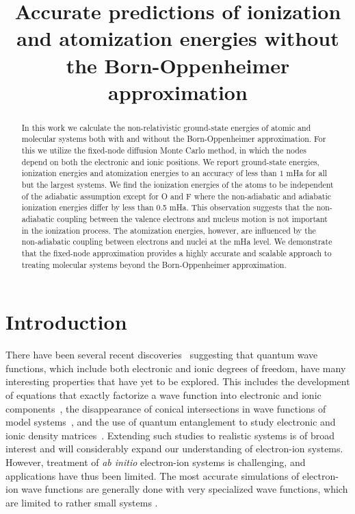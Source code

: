 \documentclass[pra,superscriptaddress,groupedaddress,twocolumn]{revtex4}
\begin{document}
\title{Accurate predictions of ionization and atomization energies without the Born-Oppenheimer approximation}

\begin{abstract}
In this work we calculate the non-relativistic ground-state energies of atomic and molecular systems both with and without the Born-Oppenheimer approximation. For this we utilize the fixed-node diffusion Monte Carlo method, in which the nodes depend on both the electronic and ionic positions. We report ground-state energies, ionization energies and atomization energies to an accuracy of less than $1$ mHa for all but the largest systems. We find the ionization energies of the atoms to be independent of the adiabatic assumption except for O and F where the non-adiabatic and adiabatic ionization energies differ by less than 0.5 mHa. This observation suggests that the non-adiabatic coupling between the valence electrons and nucleus motion is not important in the ionization process. The atomization energies, however, are influenced by the non-adiabatic coupling between electrons and nuclei at the mHa level. We demonstrate that the fixed-node approximation provides a highly accurate and scalable approach to treating molecular systems beyond the Born-Oppenheimer approximation.
\end{abstract}
\maketitle

\section{Introduction}
There have been several recent discoveries~\cite{cederbaum1,gross2014,boent} suggesting that quantum wave functions, which include both electronic and ionic degrees of freedom, have many interesting properties that have yet to be explored.  This includes the development of equations that exactly factorize a wave function into electronic and ionic components~\cite{cederbaum1}, the disappearance of conical intersections in wave functions of model systems~\cite{gross2014}, and the use of quantum entanglement to study electronic and ionic density matrices~\cite{boent}.  Extending such studies to realistic systems is of broad interest and will considerably expand our understanding of electron-ion systems. However, treatment of \textit{ab initio} electron-ion systems is challenging, and applications have thus been limited. The most accurate simulations of electron-ion wave functions are generally done with very specialized wave functions, which are limited to rather small systems \cite{mitroy2013}.  
\end{document}
